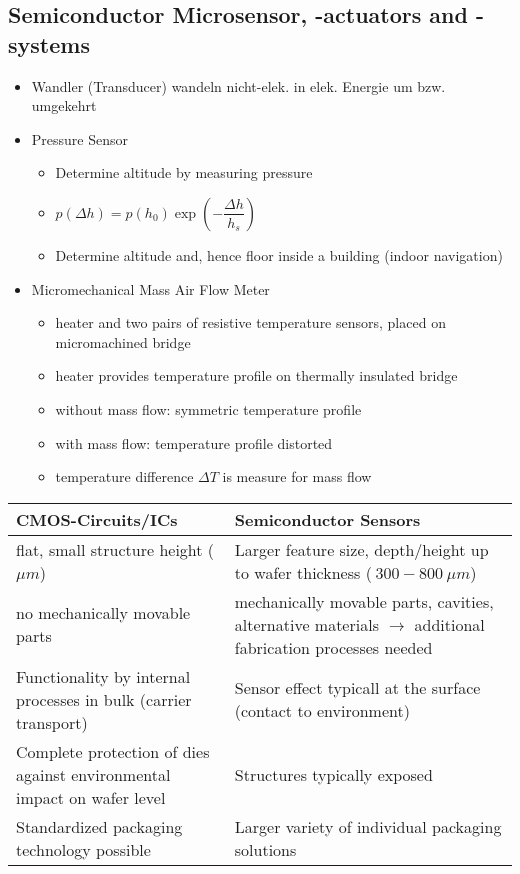 \subsection{Semiconductor Microsensor, -actuators and -systems}
\begin{itemize}
    \item Wandler (Transducer) wandeln nicht-elek. in elek. Energie um bzw. umgekehrt
    \item Pressure Sensor
        \begin{itemize}
            \item Determine altitude by measuring pressure
            \item $p(\Delta h) = p(h_{0}) \exp\left(-\dfrac{\Delta h}{h_{s}}\right)$
            \item Determine altitude and, hence floor inside a building (indoor navigation)
        \end{itemize}
    \item Micromechanical Mass Air Flow Meter
        \begin{itemize}
            \item heater and two pairs of resistive temperature sensors, placed on micromachined bridge
            \item heater provides temperature profile on thermally insulated bridge
            \item without mass flow: symmetric temperature profile
            \item with mass flow: temperature profile distorted
            \item temperature difference $\Delta T$ is measure for mass flow
        \end{itemize}
\end{itemize}
\begin{tabularx}{.5\textwidth}{XX}
    \toprule
    CMOS-Circuits/ICs & Semiconductor Sensors\\
    \midrule
    flat, small structure height ($\mu m$) & Larger feature size, depth/height up to wafer thickness ($~300 - \SI{800}{\mu m}$)\\
    \midrule
    no mechanically movable parts & mechanically movable parts, cavities, alternative materials $\to$ additional fabrication processes needed\\
    \midrule
    Functionality by internal processes in bulk (carrier transport)  & Sensor effect typicall at the surface (contact to environment)\\
    \midrule
    Complete protection of dies against environmental impact on wafer level & Structures typically exposed\\
    \midrule
    Standardized packaging technology possible & Larger variety of individual packaging solutions\\
    \bottomrule
\end{tabularx}
